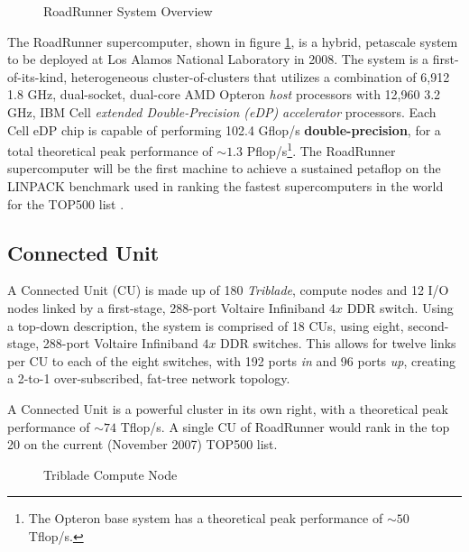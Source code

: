\documentclass[letter,10pt]{article}
\begin{document}
\begin{figure}
    \begin{center}
    \scalebox{0.3}{}
    \caption{RoadRunner System Overview}
    \label{fig:system}
    \end{center}
\end{figure}

The RoadRunner supercomputer, shown in figure \ref{fig:system}, is a hybrid, petascale system to be deployed at Los Alamos National Laboratory in 2008.  The system is a first-of-its-kind, heterogeneous cluster-of-clusters that utilizes a combination of 6,912 1.8 GHz, dual-socket, dual-core AMD Opteron \emph{host} processors with 12,960 3.2 GHz, IBM Cell \emph{extended Double-Precision (eDP)} \emph{accelerator} processors.  Each Cell eDP chip is capable of performing 102.4 Gflop/s \textbf{double-precision}, for a total theoretical peak performance of $\sim1.3$ Pflop/s\footnote{The Opteron base system has a theoretical peak performance of $\sim50$ Tflop/s.}.  The RoadRunner supercomputer will be the first machine to achieve a sustained petaflop on the LINPACK benchmark used in ranking the fastest supercomputers in the world for the TOP500 list \cite{top500}.

\subsection*{Connected Unit}

A Connected Unit (CU) is made up of 180 \emph{Triblade}, compute nodes and 12 I/O nodes linked by a first-stage, 288-port Voltaire Infiniband $4x$ DDR switch.  Using a top-down description, the system is comprised of 18 CUs, using eight, second-stage, 288-port Voltaire Infiniband $4x$ DDR switches.  This allows for twelve links per CU to each of the eight switches, with 192 ports \emph{in} and 96 ports \emph{up}, creating a 2-to-1 over-subscribed, fat-tree network topology.

A Connected Unit is a powerful cluster in its own right, with a theoretical peak performance of $\sim74$ Tflop/s.  A single CU of RoadRunner would rank in the top 20 on the current (November 2007) TOP500 list.

\begin{figure}
    \begin{center}
    \scalebox{0.4}{}
    \caption{Triblade Compute Node}
    \label{fig:triblade}
    \end{center}
\end{figure}
\end{document}
